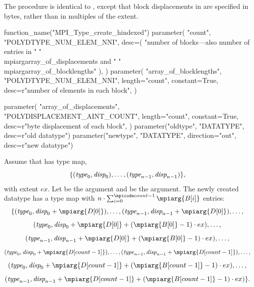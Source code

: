 The procedure
is identical to
, except that block displacements in
 are specified in
bytes, rather than in multiples of the  extent.

%
\begin{mpi-binding}
    function_name("MPI_Type_create_hindexed")
    parameter(
        "count",
        "POLYDTYPE_NUM_ELEM_NNI",
        desc=(
            "number of blocks---also number of entries in "
            "\\mpiarg{array_of_displacements} and "
            "\\mpiarg{array_of_blocklengths}"
        ),
    )
    parameter(
        "array_of_blocklengths",
        "POLYDTYPE_NUM_ELEM_NNI",
        length="count",
        constant=True,
        desc=r"number of elements in each block",
    )

    parameter(
        "array_of_displacements",
        "POLYDISPLACEMENT_AINT_COUNT",
        length="count",
        constant=True,
        desc=r"byte displacement of each block",
    )
    parameter("oldtype", "DATATYPE", desc=r"old datatype")
    parameter("newtype", "DATATYPE", direction="out", desc=r"new datatype")
\end{mpi-binding}

Assume that  has type map,
\begin{displaymath}
\{ (\textrm{\itshape{type}}_0,\textrm{\itshape{disp}}_0), \ldots, (\textrm{\itshape{type}}_{n-1}, \textrm{\itshape{disp}}_{n-1}) \} ,
\end{displaymath}
with extent $ex$.
Let  be the  argument and
 be the
 argument. The newly created datatype
has a type map with
$n \cdot \sum_{i=0}^{\mscode{count}-1}
\mpiarg{B[i]}$ entries:
\begin{displaymath}
\{
(\mword{type}_0, \mword{disp}_0 + \mpiarg{D[0]}  ) , \ldots ,
(\mword{type}_{n-1} , \mword{disp}_{n-1} + \mpiarg{D[0]} ) , \ldots ,
\end{displaymath}
\begin{displaymath}
(\mword{type}_0 , \mword{disp}_0 + \mpiarg{D[0]} +(\mpiarg{B[0]} -1) \cdot ex) ,\ldots,
\end{displaymath}
\begin{displaymath}
(\mword{type}_{n-1} , \mword{disp}_{n-1} + \mpiarg{D[0]} +(\mpiarg{B[0]} -1) \cdot ex ) ,
\ldots,
\end{displaymath}
\begin{displaymath}
(\mword{type}_0, \mword{disp}_0 + \mpiarg{D[count-1]} ) , \ldots ,
(\mword{type}_{n-1} , \mword{disp}_{n-1} + \mpiarg{D[count-1]} ) , \ldots ,
\end{displaymath}
\begin{displaymath}
(\mword{type}_0 , \mword{disp}_0 + \mpiarg{D[count-1]} +(\mpiarg{B[count-1]} -1) \cdot ex)
,\ldots,
\end{displaymath}
\begin{displaymath}
(\mword{type}_{n-1} , \mword{disp}_{n-1} + \mpiarg{D[count-1]} +(\mpiarg{B[count-1]} -1)
\cdot ex )
\} .
\end{displaymath}

